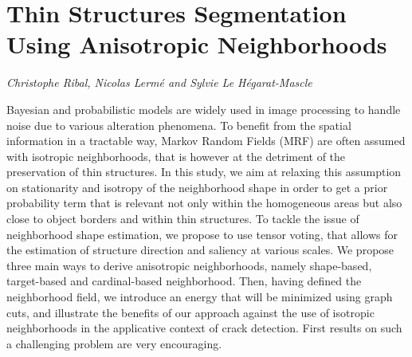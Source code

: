 \documentclass[../booklet.tex]{subfiles}
\begin{document}
\section[Thin Structures Segmentation Using Anisotropic Neighborhoods. {\it Christophe Ribal, Nicolas Lermé and Sylvie Le Hégarat-Mascle}]{Thin Structures Segmentation Using Anisotropic Neighborhoods}
  

\begin{center}
  {\it Christophe Ribal, Nicolas Lermé and Sylvie Le Hégarat-Mascle}
\end{center}

\vskip 0.8cm

Bayesian and probabilistic models are widely used in image processing to handle noise due to various alteration phenomena. To benefit from the spatial information in a tractable way, Markov Random Fields (MRF) are often assumed with isotropic neighborhoods, that is however at the
detriment of the preservation of thin structures. In this study, we aim at relaxing this assumption on stationarity and isotropy of the neighborhood shape in order to get a prior probability term that is relevant not only within the homogeneous areas but also close to object borders and within thin structures. To tackle the issue of neighborhood shape estimation, we propose to use tensor voting, that allows for the estimation of structure direction and saliency at various scales. We propose three main ways to derive anisotropic neighborhoods, namely shape-based, target-based and cardinal-based neighborhood. Then, having defined the neighborhood field, we introduce an
energy that will be minimized using graph cuts, and illustrate the benefits of our approach against the use of isotropic neighborhoods in the applicative context of crack detection. First results on such a challenging problem are very encouraging.

\end{document}
